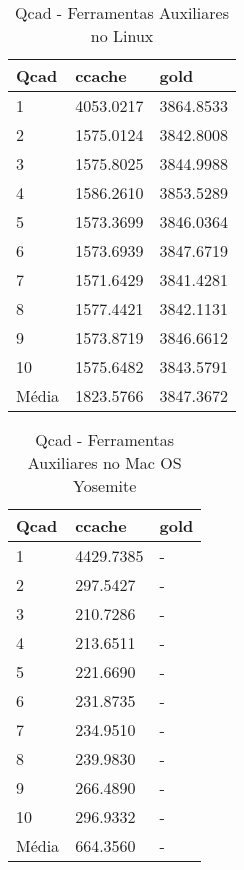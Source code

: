 \begin{table}[!ht]
\centering
\caption{Qcad - Ferramentas Auxiliares no Linux}
\label{tab:ferramentas_auxliares:linux:qcad}
\begin{tabular}{lll}
\textbf{Qcad} & \textbf{ccache} &  \textbf{gold}  \\ \toprule
1      & 4053.0217 &   3864.8533 \\ 
2      & 1575.0124 &   3842.8008 \\ 
3      & 1575.8025 &   3844.9988 \\ 
4      & 1586.2610 &   3853.5289 \\ 
5      & 1573.3699 &   3846.0364 \\ 
6      & 1573.6939 &   3847.6719 \\ 
7      & 1571.6429 &   3841.4281 \\ 
8      & 1577.4421 &   3842.1131 \\ 
9      & 1573.8719 &   3846.6612 \\ 
10     & 1575.6482 &   3843.5791 \\ \bottomrule
Média  & 1823.5766 &   3847.3672 \\ 
\end{tabular}
\end{table}


\begin{table}[!ht]
\centering
\caption{Qcad - Ferramentas Auxiliares no Mac OS Yosemite}
\label{tab:ferramentas_auxliares:mac:qcad}
\begin{tabular}{lll}
\textbf{Qcad} & \textbf{ccache} &  \textbf{gold}  \\ \toprule
1    & 4429.7385 &  -    \\ 
2    & 297.5427  &  -    \\ 
3    & 210.7286  &  -    \\ 
4    & 213.6511  &  -    \\ 
5    & 221.6690  &  -    \\ 
6    & 231.8735  &  -    \\ 
7    & 234.9510  &  -    \\ 
8    & 239.9830  &  -    \\ 
9    & 266.4890  &  -    \\ 
10   & 296.9332  &  -    \\ \bottomrule
Média& 664.3560  &  -    \\ 
\end{tabular}
\end{table}
